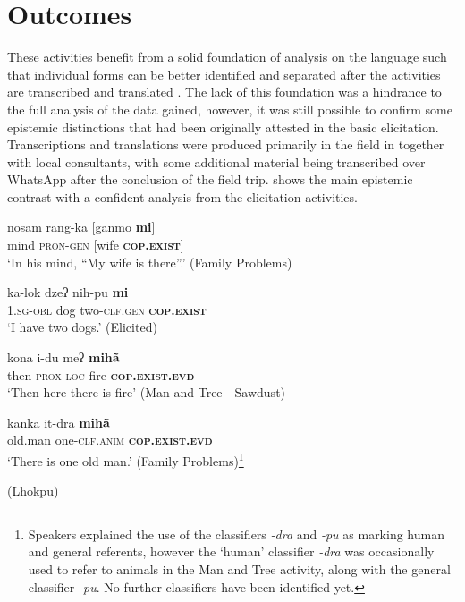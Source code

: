 \section{Outcomes}
These activities benefit from a solid foundation of analysis on the language such that individual forms can be better identified and separated after the activities are transcribed and translated \cite{Bodnaruk2023}. The lack of this foundation was a hindrance to the full analysis of the data gained, however, it was still possible to confirm some epistemic distinctions that had been originally attested in the basic elicitation. Transcriptions and translations were produced primarily in the field in  together with local consultants, with some additional material being transcribed over WhatsApp after the conclusion of the field trip.  shows the main epistemic contrast with a confident analysis from the elicitation activities.

\begin{exe}
       \ex\label{e:Methods:LhokpuDistinction}
       \begin{xlist}
              \ex\label{e:Methods:LhokpuDistinction:mi1}
              \gll nosam rang-ka [ganmo \textbf{mi}] \\
              mind \textsc{pron-gen} [wife \textbf{\textsc{cop.exist}}] \\
              \glt `In his mind, “My wife is there”.' (Family Problems)

              \ex \label{e:Methods:LhokpuDistinction:mi2}
              \gll ka-lok dzeʔ nih-pu \textbf{mi} \\
              \textsc{1.sg-obl} dog two-\textsc{clf.gen} \textbf{\textsc{cop.exist}} \\
              \glt `I have two dogs.' (Elicited)

              \ex \label{e:Methods:LhokpuDistinction:miha1}
              \gll kona i-du meʔ \textbf{mihã} \\
              then \textsc{prox-loc} fire \textbf{\textsc{cop.exist.evd}} \\
              \glt `Then here there is fire' (Man and Tree - Sawdust)

              \ex \label{e:Methods:LhokpuDistinction:miha2}
              \gll kanka it-dra \textbf{mihã} \\
              old.man one-\textsc{clf.anim}  \textbf{\textsc{cop.exist.evd}} \\
              \glt `There is one old man.' (Family Problems)\footnote{Speakers explained the use of the classifiers \textit{-dra} and \textit{-pu} as marking human and general referents, however the `human' classifier \textit{-dra} was occasionally used to refer to animals in the Man and Tree activity, along with the general classifier \textit{-pu}. No further classifiers have been identified yet.}
       \end{xlist}
       (Lhokpu)
\end{exe}

